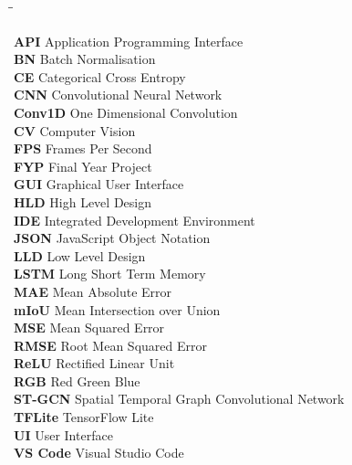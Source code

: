 \documentclass[12pt]{report}
\begin{document}
\begin{tabbing}
\hspace{4cm}\=\hspace{8cm}\=\kill

\textbf{API} \> Application Programming Interface \\
\textbf{BN} \> Batch Normalisation \\
\textbf{CE} \> Categorical Cross Entropy \\
\textbf{CNN} \> Convolutional Neural Network \\
\textbf{Conv1D} \> One Dimensional Convolution \\
\textbf{CV} \> Computer Vision \\
\textbf{FPS} \> Frames Per Second \\
\textbf{FYP} \> Final Year Project \\
\textbf{GUI} \> Graphical User Interface \\
\textbf{HLD} \> High Level Design \\
\textbf{IDE} \> Integrated Development Environment \\
\textbf{JSON} \> JavaScript Object Notation \\
\textbf{LLD} \> Low Level Design \\
\textbf{LSTM} \> Long Short Term Memory \\
\textbf{MAE} \> Mean Absolute Error \\
\textbf{mIoU} \> Mean Intersection over Union \\
\textbf{MSE} \> Mean Squared Error \\
\textbf{RMSE} \> Root Mean Squared Error \\
\textbf{ReLU} \> Rectified Linear Unit \\
\textbf{RGB} \> Red Green Blue \\
\textbf{ST-GCN} \> Spatial Temporal Graph Convolutional Network \\
\textbf{TFLite} \> TensorFlow Lite \\
\textbf{UI} \> User Interface \\
\textbf{VS Code} \> Visual Studio Code \\
\end{tabbing}
\clearpage
{}


\pagestyle{fancy}

\fancyhf{}

\renewcommand{\headrulewidth}{0pt}
\end{document}
